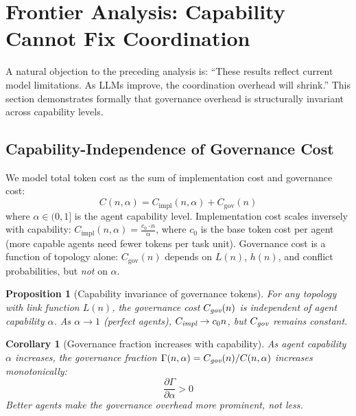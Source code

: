 \documentclass[11pt,a4paper]{article}
\newtheorem{proposition}{Proposition}
\newtheorem{corollary}{Corollary}
\begin{document}
\section{Frontier Analysis: Capability Cannot Fix Coordination}
\label{sec:frontier}

A natural objection to the preceding analysis is: ``These results reflect current model limitations. As LLMs improve, the coordination overhead will shrink.'' This section demonstrates formally that governance overhead is structurally invariant across capability levels.

\subsection{Capability-Independence of Governance Cost}

We model total token cost as the sum of implementation cost and governance cost:
\begin{equation}
C(n, \alpha) = C_{\text{impl}}(n, \alpha) + C_{\text{gov}}(n)
\end{equation}
where $\alpha \in (0, 1]$ is the agent capability level. Implementation cost scales inversely with capability: $C_{\text{impl}}(n, \alpha) = \frac{c_0 \cdot n}{\alpha}$, where $c_0$ is the base token cost per agent (more capable agents need fewer tokens per task unit). Governance cost is a function of topology alone: $C_{\text{gov}}(n)$ depends on $L(n)$, $h(n)$, and conflict probabilities, but \emph{not} on $\alpha$.

\begin{proposition}[Capability invariance of governance tokens]
\label{prop:capability-invariance}
For any topology with link function $L(n)$, the governance cost $C_{\emph{gov}}(n)$ is independent of agent capability $\alpha$. As $\alpha \to 1$ (perfect agents), $C_{\emph{impl}} \to c_0 n$, but $C_{\emph{gov}}$ remains constant.
\end{proposition}

\begin{corollary}[Governance fraction increases with capability]
\label{cor:gov-fraction}
As agent capability $\alpha$ increases, the governance fraction $\Gamma(n, \alpha) = C_{\emph{gov}}(n) / C(n, \alpha)$ increases monotonically:
\begin{equation}
\frac{\partial \Gamma}{\partial \alpha} > 0
\end{equation}
Better agents make the governance overhead \emph{more} prominent, not less.
\end{corollary}
\end{document}
